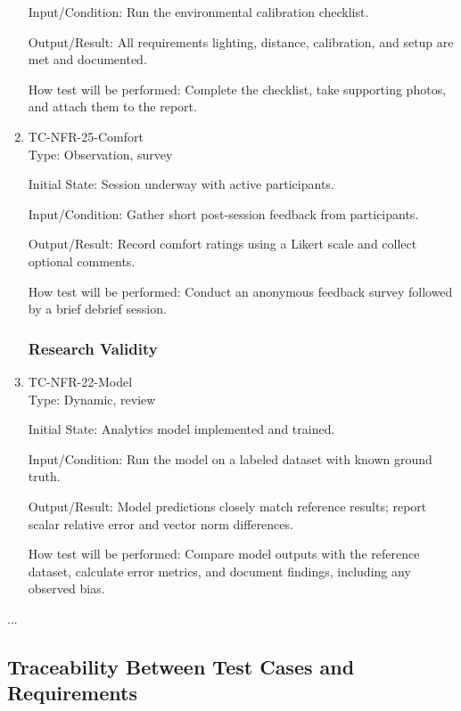 \documentclass[12pt, titlepage]{article}
\begin{document}
\begin{enumerate}
Input/Condition: Run the environmental calibration checklist.

Output/Result: All requirements lighting, distance, calibration, and setup are met and documented.

How test will be performed: Complete the checklist, take supporting photos, and attach them to the report.

\item{TC-NFR-25-Comfort\\}
Type: Observation, survey

Initial State: Session underway with active participants.

Input/Condition: Gather short post-session feedback from participants.

Output/Result: Record comfort ratings using a Likert scale and collect optional comments.

How test will be performed: Conduct an anonymous feedback survey followed by a brief debrief session.

\subsubsection{Research Validity}

\item{TC-NFR-22-Model\\}
Type: Dynamic, review

Initial State: Analytics model implemented and trained.

Input/Condition: Run the model on a labeled dataset with known ground truth.

Output/Result: Model predictions closely match reference results; report scalar relative error and vector norm differences.

How test will be performed: Compare model outputs with the reference dataset, calculate error metrics, and document findings, including any observed bias.

\end{enumerate}

...

\subsection{Traceability Between Test Cases and Requirements}
\end{document}
